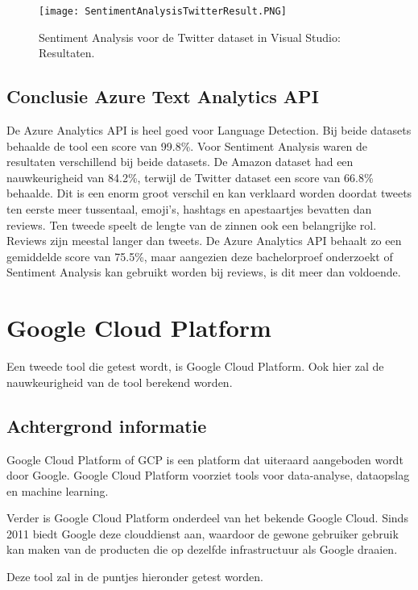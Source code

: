 \begin{figure}[!htbp]
    \texttt{[image: SentimentAnalysisTwitterResult.PNG]}
    \caption{\label{azuresentimentanalysistwitterresults}Sentiment Analysis voor de Twitter dataset in Visual Studio: Resultaten.}
\end{figure}
\FloatBarrier 

\subsection{Conclusie Azure Text Analytics API}
\label{conclusieAzure}
De Azure Analytics API is heel goed voor Language Detection. Bij beide datasets behaalde de tool een score van 99.8\%. Voor Sentiment Analysis waren de resultaten verschillend bij beide datasets. De Amazon dataset had een nauwkeurigheid van 84.2\%, terwijl de Twitter dataset een score van 66.8\% behaalde. Dit is een enorm groot verschil en kan verklaard worden doordat tweets ten eerste meer tussentaal, emoji's, hashtags en apestaartjes bevatten dan reviews. Ten tweede speelt de lengte van de zinnen ook een belangrijke rol. Reviews zijn meestal langer dan tweets. De Azure Analytics API behaalt zo een gemiddelde score van 75.5\%, maar aangezien deze bachelorproef onderzoekt of Sentiment Analysis kan gebruikt worden bij reviews, is dit meer dan voldoende. 

\section{Google Cloud Platform}

Een tweede tool die getest wordt, is Google Cloud Platform. Ook hier zal de nauwkeurigheid van de tool berekend worden.

\subsection{Achtergrond informatie}
\label{achtergrondinformatiegooglecloudplatform}
Google Cloud Platform of GCP is een platform dat uiteraard aangeboden wordt door Google. Google Cloud Platform voorziet tools voor data-analyse, dataopslag en machine learning. \autocite{Bigelow2017}

Verder is Google Cloud Platform onderdeel van het bekende Google Cloud. Sinds 2011 biedt Google deze clouddienst aan, waardoor de gewone gebruiker gebruik kan maken van de producten die op dezelfde infrastructuur als Google draaien. \autocite{Bigelow2017}

Deze tool zal in de puntjes hieronder getest worden. 

